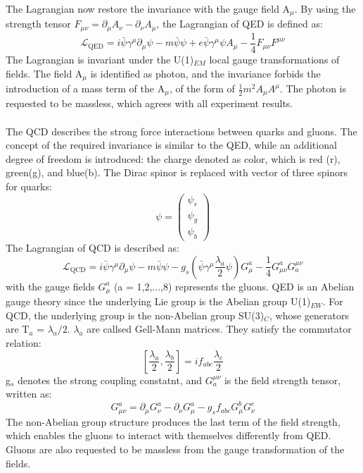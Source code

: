The Lagrangian now restore the invariance with the gauge field A$_\mu$. By using the strength tensor $F_{\mu \nu}=\partial_{\mu} A_{\nu}-\partial_{\nu} A_{\mu}$, the Lagrangian of QED is defined as:
\begin{equation}
\label{eqn:QEDLagrangian}
\mathcal{L}_{\mathrm{QED}}=i \bar{\psi} \gamma^{\mu} \partial_{\mu} \psi-m \bar{\psi} \psi+e \bar{\psi} \gamma^{\mu} \psi A_{\mu}-\frac{1}{4} F_{\mu \nu} F^{\mu \nu}
\end{equation}
The Lagrangian is invariant under the U(1)$_{EM}$ local gauge transformations of fields. The field A$_\mu$ is identified as photon, and the invariance forbids the introduction of a mass term of the A$_\mu$, of the form of $\frac{1}{2}m^2 A_\mu A^\mu$. The photon is requested to be massless, which agrees with all experiment results.
\\

\noindent\textbf{} \\ 
The QCD describes the strong force interactions between quarks and gluons. The concept of the required invariance is similar to the QED, while an additional degree of freedom is introduced: the charge denoted as color, which is red (r), green(g), and blue(b). The Dirac spinor is replaced with vector of three spinors for quarks:
\begin{equation}
\psi=\left(\begin{array}{c}
\psi_{r} \\
\psi_{g} \\
\psi_{b}
\end{array}\right)
\end{equation}
The Lagrangian of QCD is described as:
\begin{equation}
\mathcal{L}_{\mathrm{QCD}}=i \bar{\psi} \gamma^{\mu} \partial_{\mu} \psi-m \bar{\psi} \psi-g_{s}\left(\bar{\psi} \gamma^{\mu} \frac{\lambda_{a}}{2} \psi\right) G_{\mu}^{a}-\frac{1}{4} G_{\mu \nu}^{a} G_{a}^{\mu \nu}
\end{equation}
with the gauge fields $G_{\mu}^{a}$ (a = 1,2,...,8) represents the gluons.
QED is an Abelian gauge theory since the underlying Lie group is the Abelian group U(1)$_{EW}$. For QCD, the underlying group is the non-Abelian group SU(3)$_C$, whose generators are T$_a$ = $\lambda_{a}/2$. $\lambda_{a}$ are callsed Gell-Mann matrices. They satisfy the commutator relation:
\begin{equation}
\left[\frac{\lambda_{a}}{2}, \frac{\lambda_{b}}{2}\right]=i f_{a b c} \frac{\lambda_{c}}{2}
\end{equation}
g$_s$ denotes the strong coupling constatnt, and $G_{a}^{\mu \nu}$ is the field strength tensor, written as:
\begin{equation}
G_{\mu \nu}^{a}=\partial_{\mu} G_{\nu}^{a}-\partial_{\nu} G_{\mu}^{a}-g_{s} f_{a b c} G_{\mu}^{b} G_{\nu}^{c}
\end{equation}
The non-Abelian group structure produces the last term of the field strength, which enables the gluons to interact with themselves differently from QED. Gluons are also requested to be massless from the gauge transformation of the fields.
\\ \\

